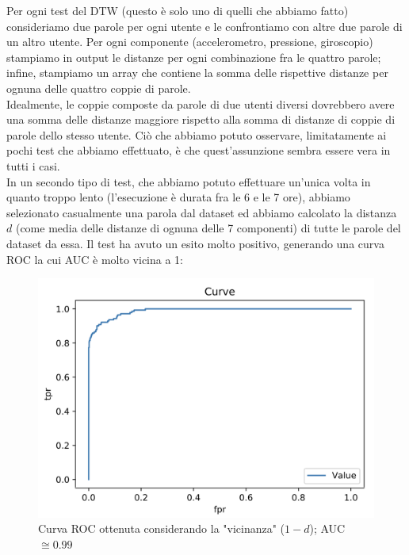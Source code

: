 \documentclass[8pt,notitlepage]{report}
\begin{document}
			Per ogni test del DTW (questo è solo uno di quelli che abbiamo fatto) consideriamo due parole per ogni utente e le confrontiamo con altre due parole di un altro utente. Per ogni componente (accelerometro, pressione, giroscopio) stampiamo in output le distanze per ogni combinazione fra le quattro parole; infine, stampiamo un array che contiene la somma delle rispettive distanze per ognuna delle quattro coppie di parole. \\
			Idealmente, le coppie composte da parole di due utenti diversi dovrebbero avere una somma delle distanze maggiore rispetto alla somma di distanze di coppie di parole dello stesso utente. Ciò che abbiamo potuto osservare, limitatamente ai pochi test che abbiamo effettuato, è che quest'assunzione sembra essere vera in tutti i casi. \\
			In un secondo tipo di test, che abbiamo potuto effettuare un'unica volta in quanto troppo lento (l'esecuzione è durata fra le 6 e le 7 ore),  abbiamo selezionato casualmente una parola dal dataset ed abbiamo calcolato la distanza $ d $ (come media delle distanze di ognuna delle 7 componenti) di tutte le parole del dataset da essa. Il test ha avuto un esito molto positivo, generando una curva ROC la cui AUC è molto vicina a 1:
			
			\begin{figure}[H]
				\begin{center}
					\includegraphics[scale=.4]{ROC_DTW_Antonio}
					\caption{Curva ROC ottenuta considerando la "vicinanza" ($ 1 - d $); AUC $ \cong 0.99 $}
				\end{center}
			\end{figure}
			
\end{document}
